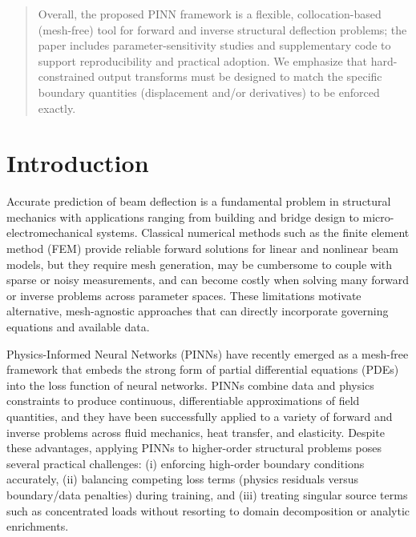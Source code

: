 \documentclass[twocolumn]{svjour3}
\begin{document}
\begin{abstract}
		Overall, the proposed PINN framework is a flexible, collocation-based (mesh-free) tool for forward and inverse structural deflection problems; the paper includes parameter-sensitivity studies and supplementary code to support reproducibility and practical adoption. We emphasize that hard-constrained output transforms must be designed to match the specific boundary quantities (displacement and/or derivatives) to be enforced exactly.
	\end{abstract}


	\section{Introduction}

	Accurate prediction of beam deflection is a fundamental problem in structural mechanics with applications ranging from building and bridge design to micro-electromechanical systems. Classical numerical methods such as the finite element method (FEM) provide reliable forward solutions for linear and nonlinear beam models, but they require mesh generation, may be cumbersome to couple with sparse or noisy measurements, and can become costly when solving many forward or inverse problems across parameter spaces. These limitations motivate alternative, mesh-agnostic approaches that can directly incorporate governing equations and available data.

	Physics-Informed Neural Networks (PINNs) have recently emerged as a mesh-free framework that embeds the strong form of partial differential equations (PDEs) into the loss function of neural networks. PINNs combine data and physics constraints to produce continuous, differentiable approximations of field quantities, and they have been successfully applied to a variety of forward and inverse problems across fluid mechanics, heat transfer, and elasticity. Despite these advantages, applying PINNs to higher-order structural problems poses several practical challenges: (i) enforcing high-order boundary conditions accurately, (ii) balancing competing loss terms (physics residuals versus boundary/data penalties) during training, and (iii) treating singular source terms such as concentrated loads without resorting to domain decomposition or analytic enrichments.
\end{document}
